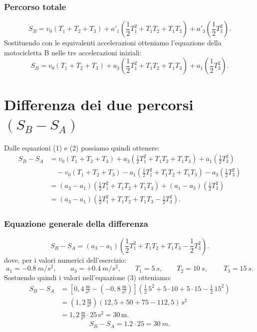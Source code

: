 \documentclass[a4paper,11pt]{article}
\begin{document}
\subsubsection{Percorso totale}
\[
S_B = v_0 (T_1 + T_2 + T_3)
      + a'_1 \left( \frac{1}{2} T_1^2 + T_1 T_2 + T_1 T_3 \right)
      + a'_3 \left( \frac{1}{2} T_3^2 \right).
\]
Sostituendo con le equivalenti accelerazioni otteniamo l'equazione della motocicletta B nelle tre accelerazioni iniziali:
\[
S_B = v_0 (T_1 + T_2 + T_3)
      + a_3 \left( \frac{1}{2} T_1^2 + T_1 T_2 + T_1 T_3 \right)
      + a_1 \left( \frac{1}{2} T_3^2 \right). \tag{2}
\]
\section{Differenza dei due percorsi $(S_B - S_A)$}
Dalle equazioni (1) e (2) possiamo quindi ottenere:
\[
\begin{aligned}
S_B - S_A
&= v_0 (T_1 + T_2 + T_3)
 + a_3 \left( \frac{1}{2} T_1^2 + T_1 T_2 + T_1 T_3 \right)
 + a_1 \left( \frac{1}{2} T_3^2 \right) \\[6pt]
&\quad - v_0 (T_1 + T_2 + T_3)
 - a_1 \left( \frac{1}{2} T_1^2 + T_1 T_2 + T_1 T_3 \right)
 - a_3 \left( \frac{1}{2} T_3^2 \right) \\[6pt]
&= (a_3 - a_1)
   \left( \frac{1}{2} T_1^2 + T_1 T_2 + T_1 T_3 \right)
 + (a_1 - a_3)
   \left( \frac{1}{2} T_3^2 \right) \\[6pt]
&= (a_3 - a_1)
   \left( \frac{1}{2} T_1^2 + T_1 T_2 + T_1 T_3
          - \frac{1}{2} T_3^2 \right).
\end{aligned}  
\]
\subsubsection{Equazione generale della differenza }
\[
S_B - S_A = (a_3 - a_1)
   \left( \frac{1}{2} T_1^2 + T_1 T_2 + T_1 T_3
          - \frac{1}{2} T_3^2 \right).\tag{3}
\]
dove, per i valori numerici dell'esercizio:
\[
a_1=-0.8~\si{m/s^2},\qquad a_3=+0.4~\si{m/s^2}, \qquad T_1=5~\si{s},\qquad T_2=10~\si{s},\qquad\ T_3 = 15~\si{s}.
\]
Sostuendo quindi i valori nell'equazione (3) otteniamo:
\[
\begin{aligned}
S_B - S_A
&= \left[ 0{,}4\,\frac{\text{m}}{\text{s}^2}
          - \left(-0{,}8\,\frac{\text{m}}{\text{s}^2}\right) \right]
   \left( \frac{1}{2}\,5^2 + 5\cdot 10 + 5\cdot 15 - \frac{1}{2}\,15^2 \right) \\[6pt]
&= \left( 1{,}2\,\frac{\text{m}}{\text{s}^2} \right)
   \left( 12{,}5 + 50 + 75 - 112{,}5 \right)\,\text{s}^2 \\[6pt]
&= 1{,}2\,\frac{\text{m}}{\text{s}^2} \cdot 25\,\text{s}^2
 = 30\,\text{m}.
\end{aligned}
\]
\[
S_B-S_A = 1.2\cdot 25 = 30~\si{m}.
\]
\end{document}
